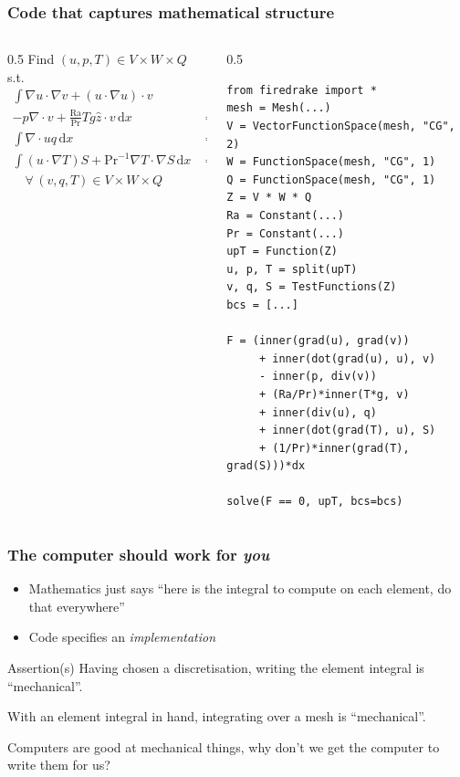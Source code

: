 \documentclass[presentation,aspectratio=43, 10pt]{beamer}
\begin{document}
\begin{frame}[fragile]
  \frametitle{Code that captures mathematical structure}
  \begin{columns}
    \begin{column}{0.5\framewidth}
      {\footnotesize
        Find $(u, p, T) \in V\times W\times Q$ s.t.
        \begin{align*}
          \int\!\nabla u \cdot \nabla v + (u \cdot \nabla u) \cdot v \\
          - p\nabla\cdot v + \frac{\text{Ra}}{\text{Pr}} Tg \hat{z} \cdot v\,\text{d}x &= 0 \\
          \int\!\nabla\cdot u q\,\text{d}x&= 0\\
          \int\! (u\cdot \nabla T) S + \text{Pr}^{-1} \nabla T \cdot \nabla
          S\,\text{d}x &= 0\\
          \quad \forall\, (v,q,T) \in V\times W \times Q
        \end{align*}
        }
    \end{column}
      \begin{column}{0.5\framewidth}
\begin{verbatim}
from firedrake import *
mesh = Mesh(...)
V = VectorFunctionSpace(mesh, "CG", 2)
W = FunctionSpace(mesh, "CG", 1)
Q = FunctionSpace(mesh, "CG", 1)
Z = V * W * Q
Ra = Constant(...)
Pr = Constant(...)
upT = Function(Z)
u, p, T = split(upT)
v, q, S = TestFunctions(Z)
bcs = [...]

F = (inner(grad(u), grad(v))
     + inner(dot(grad(u), u), v)
     - inner(p, div(v))
     + (Ra/Pr)*inner(T*g, v)
     + inner(div(u), q)
     + inner(dot(grad(T), u), S)
     + (1/Pr)*inner(grad(T), grad(S)))*dx

solve(F == 0, upT, bcs=bcs)
\end{verbatim}
      \end{column}
  \end{columns}
\end{frame}

\begin{frame}
  \frametitle{The computer should work for \emph{you}}
  \begin{itemize}
  \item Mathematics just says ``here is the integral to compute on each
    element, do that everywhere''
  \item Code specifies an \emph{implementation}
  \end{itemize}
  \begin{block}{Assertion(s)}
    Having chosen a discretisation, writing the element integral is ``mechanical''.

    With an element integral in hand, integrating over a mesh is
    ``mechanical''.
  \end{block}

  \begin{corollary}
    Computers are good at mechanical things, why don't we get the
    computer to write them for us?
  \end{corollary}
\end{frame}
\end{document}
